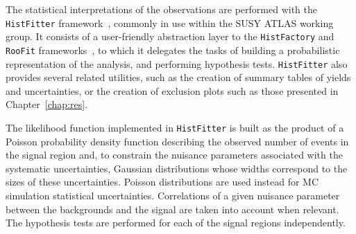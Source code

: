 The statistical interpretations of the observations 
are performed with the \texttt{HistFitter} framework~\cite{Baak:2014wma}, commonly in use within the SUSY ATLAS working group. 
It consists of a user-friendly abstraction layer to the \texttt{HistFactory} and \texttt{RooFit} frameworks~\cite{Cranmer:1456844,Verkerke:2003ir}, 
to which it delegates the tasks of building a probabilistic representation of the analysis, and performing hypothesis tests. 
\texttt{HistFitter} also provides several related utilities, 
such as the creation of summary tables of yields and uncertainties, or the creation of exclusion plots such as those presented in Chapter~\ref{chap:res}.

The likelihood function implemented in \texttt{HistFitter} is built as the 
product of a Poisson probability density function describing the observed 
number of events in the signal region 
and, to constrain the nuisance parameters associated with the systematic 
uncertainties, 
Gaussian distributions whose widths correspond to the sizes of these 
uncertainties.
Poisson distributions are used instead for MC simulation statistical 
uncertainties.
Correlations of a given nuisance parameter between the backgrounds and the 
signal are taken into account when relevant. 
The hypothesis tests are performed for each of the signal regions 
independently. 
